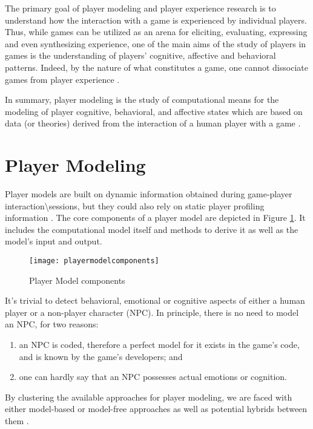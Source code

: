 The primary goal of player modeling and player experience research is to understand how the interaction with a game is experienced by individual players. Thus, while games can be utilized as an arena for eliciting, evaluating, expressing and even synthesizing experience, one of the main aims of the study of players in games is the understanding of players’ cognitive, affective and behavioral patterns. Indeed, by the nature of what constitutes a game, one cannot dissociate games from player experience \citep{YannakakisPlayerModeling2013}.

In summary, player modeling is the study of computational means for the modeling of player cognitive, behavioral, and affective states which are based on data (or theories) derived from the interaction of a human player with a game \citep{YannakakisGameAIRevisited2012}.

\section{Player Modeling}
Player models are built on dynamic information obtained during game-player interaction\textbackslash{}sessions, but they could also rely on static player profiling information \citep{YannakakisPlayerModeling2013}.
The core components of a player model are depicted in Figure \ref{fig:pmc}. It includes the computational model itself and methods to derive it as well as the model’s input and output.

\begin{figure}
    \centering
      \texttt{[image: playermodelcomponents]}
      \caption{Player Model components}
      \label{fig:pmc}
  \end{figure}

  It’s trivial to detect behavioral, emotional or cognitive aspects of either a human player or a non-player character (NPC).
  In principle, there is no need to model an NPC, for two reasons:
  
  \begin{enumerate}
    \item an NPC is coded, therefore a perfect model for it exists in the game’s code, and is known by the game’s developers; and
    \item one can hardly say that an NPC possesses actual emotions or cognition.
  \end{enumerate}
  
By clustering the available approaches for player modeling, we are faced with either model-based or model-free  approaches as well as potential hybrids between them \citep{YannakakisPlayerModeling2013}.

